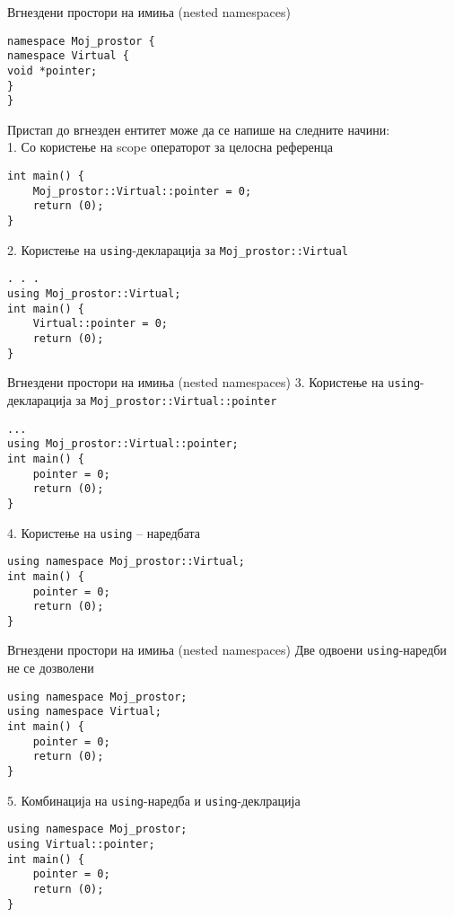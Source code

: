 \begin{frame}[fragile]{Вгнездени простори на имиња (nested namespaces)}
\begin{lstlisting}
namespace Moj_prostor {
namespace Virtual {
void *pointer;
}
}
\end{lstlisting}
Пристап до вгнезден ентитет може да се напише на следните начини:\\
1. Со користење на scope операторот за целосна референца
\begin{lstlisting}
int main() {
    Moj_prostor::Virtual::pointer = 0;
    return (0);
}
\end{lstlisting}

2. Користење на \texttt{using}-декларација за \texttt{Moj\_prostor::Virtual}
\begin{lstlisting}
. . .
using Moj_prostor::Virtual;
int main() {
    Virtual::pointer = 0;
    return (0);
}
\end{lstlisting}
\end{frame}

\begin{frame}[fragile]{Вгнездени простори на имиња (nested namespaces)}
3. Користење на \texttt{using}-декларација за \texttt{Moj\_prostor::Virtual::pointer}
\begin{lstlisting}
...
using Moj_prostor::Virtual::pointer;
int main() {
    pointer = 0;
    return (0);
}
\end{lstlisting}
4. Користење на \texttt{using} – наредбата 
\begin{lstlisting}
using namespace Moj_prostor::Virtual;
int main() {
    pointer = 0;
    return (0);
}
\end{lstlisting}
\end{frame}

\begin{frame}[fragile]{Вгнездени простори на имиња (nested namespaces)}
Две одвоени \texttt{using}-наредби не се дозволени
\begin{lstlisting}
using namespace Moj_prostor;
using namespace Virtual;
int main() {
    pointer = 0;
    return (0);
}
\end{lstlisting}
5. Комбинација на \texttt{using}-наредба и \texttt{using}-деклрација
\begin{lstlisting}
using namespace Moj_prostor;
using Virtual::pointer;
int main() {
    pointer = 0;
    return (0);
}
\end{lstlisting}
\end{frame}

